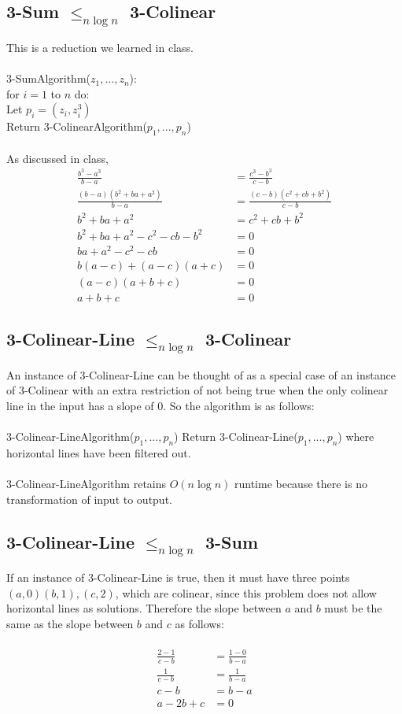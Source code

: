 \documentclass[letterpaper,notitlepage,twoside]{article}
\newcommand\tab[1][1cm]{\hspace*{#1}} %
\begin{document}
\subsection*{3-Sum $\leq_{n \log n}$ 3-Colinear}
This is a reduction we learned in class.
\\\\
3-SumAlgorithm($z_1,...,z_n$):\\
\tab for $i = 1$ to $n$ do:\\
\tab\tab Let $p_i = (z_i, z_i^3)$\\
\tab Return 3-ColinearAlgorithm($p_1,...,p_n$)
\\\\
As discussed in class,
\begin{align*}
\frac{b^3 - a^3}{b - a} &= \frac{c^3 - b^3}{c - b}\\
\frac{(b - a)(b^2 + ba + a^2)}{b - a} &= \frac{(c - b)(c^2 + cb + b^2)}{c - b}\\
b^2 + ba + a^2 &= c^2 + cb + b^2\\
b^2 + ba + a^2 - c^2 - cb - b^2 &= 0\\
ba + a^2 - c^2 - cb &= 0\\
b(a - c) + (a - c)(a + c) &= 0\\
(a - c)(a + b + c) &= 0\\
a + b + c &= 0
\end{align*}

\subsection*{3-Colinear-Line $\leq_{n \log n}$  3-Colinear}
An instance of 3-Colinear-Line can be thought of as a special case of an instance of 3-Colinear with an extra restriction of not being true when the only colinear line in the input has a slope of 0. So the algorithm is as follows:
\\\\
3-Colinear-LineAlgorithm($p_1,...,p_n$)
\tab Return 3-Colinear-Line($p_1,...,p_n$) where horizontal lines have been filtered out.
\\\\
3-Colinear-LineAlgorithm retains $O(n \log n)$ runtime because there is no transformation of input to output.

\subsection*{3-Colinear-Line $\leq_{n \log n}$ 3-Sum}
If an instance of 3-Colinear-Line is true, then it must have three points $(a, 0) (b, 1), (c, 2)$, which are colinear, since this problem does not allow horizontal lines as solutions. Therefore the slope between $a$ and $b$ must be the same as the slope between $b$ and $c$ as follows:
\\\\
\begin{align*}
\frac{2 - 1}{c - b} &= \frac{1 - 0}{b - a}\\
\frac{1}{c - b} &= \frac{1}{b - a}\\
c - b &= b - a\\
a - 2b + c &= 0
\end{align*}
\end{document}
